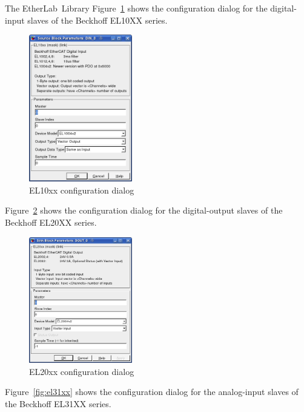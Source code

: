 \begin{ighsec}{The EtherLab\regTM\ Library}
Figure~\ref{fig:el10xx} shows the configuration dialog for the
digital-input slaves of the Beckhoff EL10XX series.

\begin{figure}[H]
  \begin{center}
    \includegraphics[width=0.4\textwidth]{images/el10xx.png}
    \caption{EL10xx configuration dialog}
    \label{fig:el10xx}
  \end{center}
\end{figure}

Figure~\ref{fig:el20xx} shows the configuration dialog for the
digital-output slaves of the Beckhoff EL20XX series.

\begin{figure}[H]
  \begin{center}
    \includegraphics[width=0.4\textwidth]{images/el20xx.png}
    \caption{EL20xx configuration dialog}
    \label{fig:el20xx}
  \end{center}
\end{figure}

Figure~\ref{fig:el31xx} shows the configuration dialog for the
analog-input slaves of the Beckhoff EL31XX series.


\end{ighsec}
